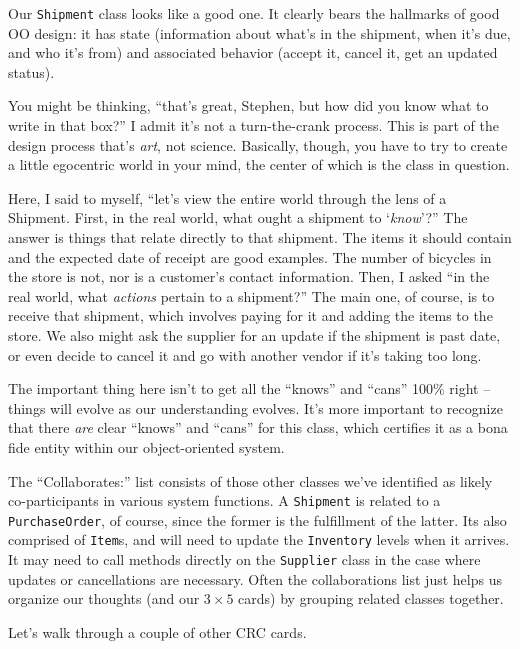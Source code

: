 Our \texttt{Shipment} class looks like a good one. It clearly bears the
hallmarks of good OO design: it has state (information about what's in the
shipment, when it's due, and who it's from) and associated behavior (accept
it, cancel it, get an updated status).

You might be thinking, ``that's great, Stephen, but how did you know what to
write in that box?'' I admit it's not a turn-the-crank process. This is part of
the design process that's \textit{art}, not science. Basically, though, you
have to try to create a little egocentric world in your mind, the center of
which is the class in question. 

Here, I said to myself, ``let's view the entire world through the lens of a
Shipment. First, in the real world, what ought a shipment to `\textit{know}'?''
The answer is things that relate directly to that shipment. The items it should
contain and the expected date of receipt are good examples. The number of
bicycles in the store is not, nor is a customer's contact information. Then, I
asked ``in the real world, what \textit{actions} pertain to a shipment?'' The
main one, of course, is to receive that shipment, which involves paying for it
and adding the items to the store. We also might ask the supplier for an update
if the shipment is past date, or even decide to cancel it and go with another
vendor if it's taking too long.

The important thing here isn't to get all the ``knows'' and ``cans'' 100\%
right -- things will evolve as our understanding evolves. It's more important
to recognize that there \textit{are} clear ``knows'' and ``cans'' for this
class, which certifies it as a bona fide entity within our object-oriented
system.

The ``Collaborates:'' list consists of those other classes we've identified as
likely co-participants in various system functions. A \texttt{Shipment} is
related to a \texttt{PurchaseOrder}, of course, since the former is the
fulfillment of the latter. Its also comprised of \texttt{Item}s, and will need
to update the \texttt{Inventory} levels when it arrives. It may need to call
methods directly on the \texttt{Supplier} class in the case where updates or
cancellations are necessary. Often the collaborations list just helps us
organize our thoughts (and our $3\times5$ cards) by grouping related classes
together.

Let's walk through a couple of other CRC cards.

